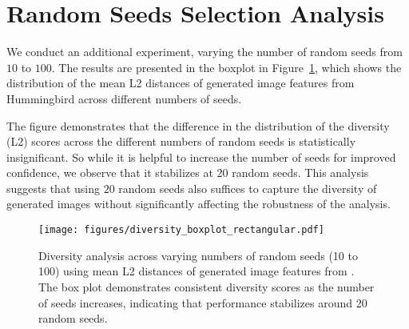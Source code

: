 \section{Random Seeds Selection Analysis}
We conduct an additional experiment, varying the number of random seeds from $10$ to $100$. The results are presented in the boxplot in Figure~\ref{fig:boxplot}, which shows the distribution of the mean L2 distances of generated image features from Hummingbird across different numbers of seeds.


The figure demonstrates that the difference in the distribution of the diversity (L2) scores across the different numbers of random seeds is statistically insignificant. So while it is helpful to increase the number of seeds for improved confidence, we observe that it stabilizes at 20 random seeds. This analysis suggests that using $20$ random seeds also suffices to capture the diversity of generated images without significantly affecting the robustness of the analysis.



\begin{figure}[!h]
    \centering
    \texttt{[image: figures/diversity\_boxplot\_rectangular.pdf]}
    \caption{Diversity analysis across varying numbers of random seeds (10 to 100) using mean L2 distances of generated image features from \method. The box plot demonstrates consistent diversity scores as the number of seeds increases, indicating that performance stabilizes around 20 random seeds.}
    \label{fig:boxplot}
\end{figure}

